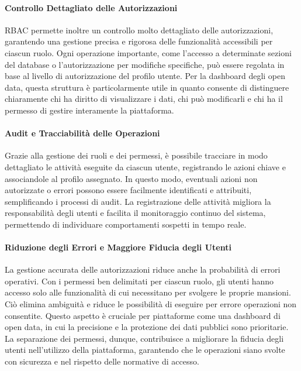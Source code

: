 \paragraph{Controllo Dettagliato delle Autorizzazioni}
RBAC permette inoltre un controllo molto dettagliato delle autorizzazioni, garantendo una gestione precisa e rigorosa delle funzionalità accessibili per ciascun ruolo. Ogni operazione importante, come l’accesso a determinate sezioni del database o l’autorizzazione per modifiche specifiche, può essere regolata in base al livello di autorizzazione del profilo utente. Per la dashboard degli open data, questa struttura è particolarmente utile in quanto consente di distinguere chiaramente chi ha diritto di visualizzare i dati, chi può modificarli e chi ha il permesso di gestire interamente la piattaforma. \cite{sandhu1996role}

\paragraph{Audit e Tracciabilità delle Operazioni}
Grazie alla gestione dei ruoli e dei permessi, è possibile tracciare in modo dettagliato le attività eseguite da ciascun utente, registrando le azioni chiave e associandole al profilo assegnato. In questo modo, eventuali azioni non autorizzate o errori possono essere facilmente identificati e attribuiti, semplificando i processi di audit. La registrazione delle attività migliora la responsabilità degli utenti e facilita il monitoraggio continuo del sistema, permettendo di individuare comportamenti sospetti in tempo reale. \cite{davidson2016role}

\paragraph{Riduzione degli Errori e Maggiore Fiducia degli Utenti}
La gestione accurata delle autorizzazioni riduce anche la probabilità di errori operativi. Con i permessi ben delimitati per ciascun ruolo, gli utenti hanno accesso solo alle funzionalità di cui necessitano per svolgere le proprie mansioni. Ciò elimina ambiguità e riduce le possibilità di eseguire per errore operazioni non consentite. Questo aspetto è cruciale per piattaforme come una dashboard di open data, in cui la precisione e la protezione dei dati pubblici sono prioritarie. La separazione dei permessi, dunque, contribuisce a migliorare la fiducia degli utenti nell’utilizzo della piattaforma, garantendo che le operazioni siano svolte con sicurezza e nel rispetto delle normative di accesso.\cite{wright2017rbac}


